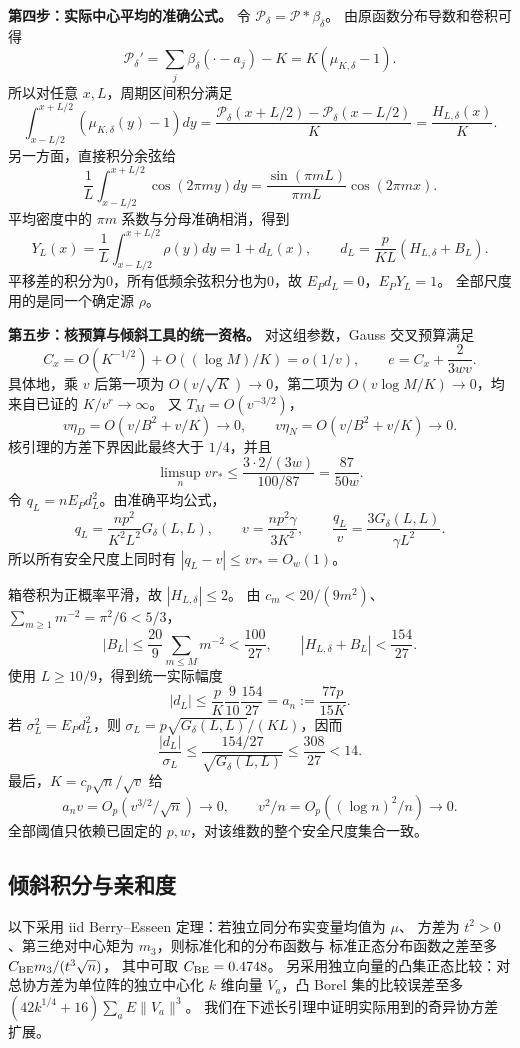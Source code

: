 \documentclass[UTF8,a4paper,11pt,fontset=fandol]{ctexart}
\theoremstyle{remark}
\begin{document}
\textbf{第四步：实际中心平均的准确公式。}
令 $\mathcal P_\delta=\mathcal P*\beta_\delta$。
由原函数分布导数和卷积可得
\[
 \mathcal P_\delta'=\sum_j\beta_\delta(\cdot-a_j)-K
 =K(\mu_{K,\delta}-1).
\]
所以对任意 $x,L$，周期区间积分满足
\[
 \int_{x-L/2}^{x+L/2}(\mu_{K,\delta}(y)-1)dy
 =\frac{\mathcal P_\delta(x+L/2)-\mathcal P_\delta(x-L/2)}K
 =\frac{H_{L,\delta}(x)}K.
\]
另一方面，直接积分余弦给
\[
 \frac1L\int_{x-L/2}^{x+L/2}\cos(2\pi my)dy
 =\frac{\sin(\pi mL)}{\pi mL}\cos(2\pi mx).
\]
平均密度中的 $\pi m$ 系数与分母准确相消，得到
\begin{equation}\label{eq:papersourceaverage}
 Y_L(x)=\frac1L\int_{x-L/2}^{x+L/2}\rho(y)dy=1+d_L(x),
 \qquad d_L=\frac p{KL}(H_{L,\delta}+B_L).
\end{equation}
平移差的积分为0，所有低频余弦积分也为0，故 $E_Pd_L=0$，$E_PY_L=1$。
全部尺度用的是同一个确定源 $\rho$。

\textbf{第五步：核预算与倾斜工具的统一资格。}
对这组参数，Gauss 交叉预算满足
\[
 C_x=O(K^{-1/2})+O((\log M)/K)=o(1/v),
 \qquad e=C_x+\frac2{3wv}.
\]
具体地，乘 $v$ 后第一项为 $O(v/\sqrt K)\to0$，第二项为
$O(v\log M/K)\to0$，均来自已证的 $K/v^r\to\infty$。
又 $T_M=O(v^{-3/2})$，
\[
 v\eta_D=O(v/B^2+v/K)\to0,
 \qquad v\eta_N=O(v/B^2+v/K)\to0.
\]
核引理的方差下界因此最终大于 $1/4$，并且
\[
 \limsup_n vr_*
 \le\frac{3\cdot2/(3w)}{100/87}=\frac{87}{50w}.
\]
令 $q_L=nE_Pd_L^2$。由准确平均公式，
\[
 q_L=\frac{np^2}{K^2L^2}G_\delta(L,L),\qquad
 v=\frac{np^2\gamma}{3K^2},\qquad
 \frac{q_L}{v}=\frac{3G_\delta(L,L)}{\gamma L^2}.
\]
所以所有安全尺度上同时有 $|q_L-v|\le vr_*=O_w(1)$。

箱卷积为正概率平滑，故 $|H_{L,\delta}|\le2$。
由 $c_m<20/(9m^2)$、$\sum_{m\ge1}m^{-2}=\pi^2/6<5/3$，
\[
 |B_L|\le\frac{20}9\sum_{m\le M}m^{-2}<\frac{100}{27},
 \qquad|H_{L,\delta}+B_L|<\frac{154}{27}.
\]
使用 $L\ge10/9$，得到统一实际幅度
\[
 |d_L|\le\frac pK\frac9{10}\frac{154}{27}
 =a_n:=\frac{77p}{15K}.
\]
若 $\sigma_L^2=E_Pd_L^2$，则
$\sigma_L=p\sqrt{G_\delta(L,L)}/(KL)$，因而
\[
 \frac{|d_L|}{\sigma_L}\le
 \frac{154/27}{\sqrt{G_\delta(L,L)}}\le\frac{308}{27}<14.
\]
最后，$K=c_p\sqrt n/\sqrt v$ 给
\[
 a_nv=O_p(v^{3/2}/\sqrt n)\to0,
 \qquad v^2/n=O_p((\log n)^2/n)\to0.
\]
全部阈值只依赖已固定的 $p,w$，对该维数的整个安全尺度集合一致。

\subsection{倾斜积分与亲和度}
以下采用 iid Berry--Esseen 定理\cite{Shevtsova2011}：若独立同分布实变量均值为 $\mu$、
方差为 $t^2>0$、第三绝对中心矩为 $m_3$，则标准化和的分布函数与
标准正态分布函数之差至多 $C_{\rm BE}m_3/(t^3\sqrt n)$，
其中可取 $C_{\rm BE}=0.4748$。
另采用独立向量的凸集正态比较\cite{Raic2019}：对总协方差为单位阵的独立中心化
$k$ 维向量 $V_a$，凸 Borel 集的比较误差至多
$(42k^{1/4}+16)\sum_aE\|V_a\|^3$。
我们在下述长引理中证明实际用到的奇异协方差扩展。
\end{document}
